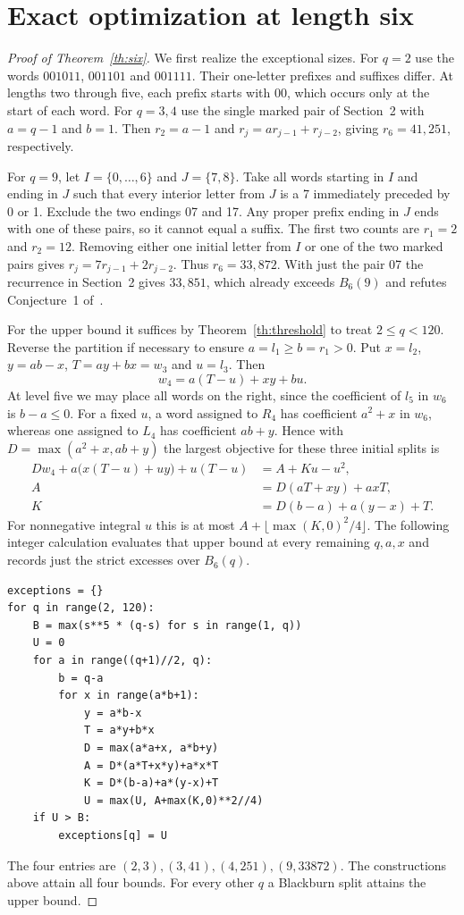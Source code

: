 \documentclass[11pt,a4paper]{article}
\newcommand{\floor}[1]{\lfloor #1\rfloor}
\begin{document}
\section{Exact optimization at length six}
\begin{proof}[Proof of Theorem~\ref{th:six}]
We first realize the exceptional sizes. For $q=2$ use the words $001011$, $001101$ and $001111$. Their one-letter prefixes and suffixes differ. At lengths two through five, each prefix starts with $00$, which occurs only at the start of each word. For $q=3,4$ use the single marked pair of Section~2 with $a=q-1$ and $b=1$. Then $r_2=a-1$ and $r_j=ar_{j-1}+r_{j-2}$, giving $r_6=41,251$, respectively.

For $q=9$, let $I=\{0,\ldots,6\}$ and $J=\{7,8\}$. Take all words starting in $I$ and ending in $J$ such that every interior letter from $J$ is a 7 immediately preceded by 0 or 1. Exclude the two endings 07 and 17. Any proper prefix ending in $J$ ends with one of these pairs, so it cannot equal a suffix. The first two counts are $r_1=2$ and $r_2=12$. Removing either one initial letter from $I$ or one of the two marked pairs gives $r_j=7r_{j-1}+2r_{j-2}$. Thus $r_6=33{,}872$. With just the pair 07 the recurrence in Section~2 gives $33{,}851$, which already exceeds $B_6(9)$ and refutes Conjecture~1 of~\cite{SMM}.

For the upper bound it suffices by Theorem~\ref{th:threshold} to treat $2\le q<120$. Reverse the partition if necessary to ensure $a=l_1\ge b=r_1>0$. Put $x=l_2$, $y=ab-x$, $T=ay+bx=w_3$ and $u=l_3$. Then
\[
 w_4=a(T-u)+xy+bu.
\]
At level five we may place all words on the right, since the coefficient of $l_5$ in $w_6$ is $b-a\le0$. For a fixed $u$, a word assigned to $R_4$ has coefficient $a^2+x$ in $w_6$, whereas one assigned to $L_4$ has coefficient $ab+y$. Hence with $D=\max(a^2+x,ab+y)$ the largest objective for these three initial splits is
\begin{align*}
 D w_4+a\bigl(x(T-u)+uy\bigr)+u(T-u)
    &= A+Ku-u^2,\\
 A &= D(aT+xy)+axT,\\
 K &= D(b-a)+a(y-x)+T.
\end{align*}
For nonnegative integral $u$ this is at most $A+\floor{\max(K,0)^2/4}$. The following integer calculation evaluates that upper bound at every remaining $q,a,x$ and records just the strict excesses over $B_6(q)$.
\begin{verbatim}
exceptions = {}
for q in range(2, 120):
    B = max(s**5 * (q-s) for s in range(1, q))
    U = 0
    for a in range((q+1)//2, q):
        b = q-a
        for x in range(a*b+1):
            y = a*b-x
            T = a*y+b*x
            D = max(a*a+x, a*b+y)
            A = D*(a*T+x*y)+a*x*T
            K = D*(b-a)+a*(y-x)+T
            U = max(U, A+max(K,0)**2//4)
    if U > B:
        exceptions[q] = U
\end{verbatim}
The four entries are $(2,3),(3,41),(4,251),(9,33872)$. The constructions above attain all four bounds. For every other $q$ a Blackburn split attains the upper bound.
\end{proof}
\end{document}
